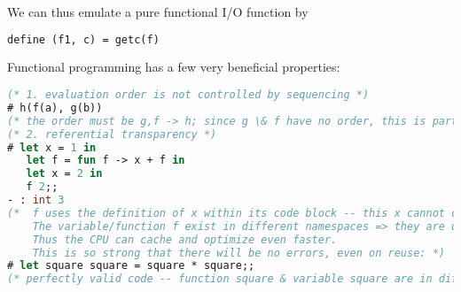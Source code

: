 \documentclass[../../lecture_notes.tex]{subfiles}
\begin{document}
	\indent \indent We can thus emulate a pure functional I/O function by \begin{lstlisting}[language=ML]
	define (f1, c) = getc(f) \end{lstlisting}
Functional programming has a few very beneficial properties: \begin{lstlisting}[language=ML]
(* 1. evaluation order is not controlled by sequencing *)
# h(f(a), g(b))
(* the order must be g,f -> h; since g \& f have no order, this is partial order *)
(* 2. referential transparency *)
# let x = 1 in
   let f = fun f -> x + f in 
   let x = 2 in
   f 2;;
- : int 3
(* 	f uses the definition of x within its code block -- this x cannot change value.
	The variable/function f exist in different namespaces => they are unambiguous.
	Thus the CPU can cache and optimize even faster.
	This is so strong that there will be no errors, even on reuse: *)
# let square square = square * square;;
(* perfectly valid code -- function square & variable square are in different namespaces *)
\end{lstlisting}
\end{document}
